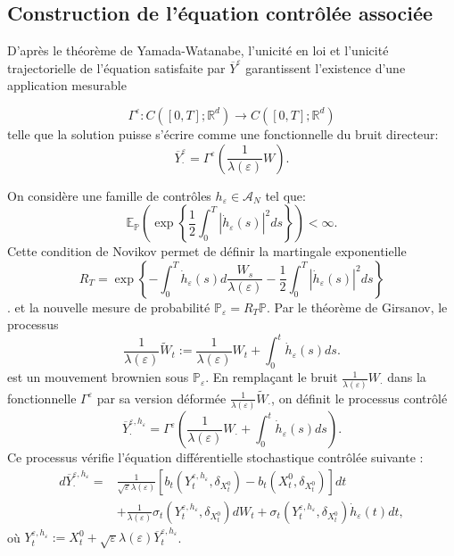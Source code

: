 \documentclass[12pt,a4paper,twoside]{report}%
\theoremstyle{definition}
\numberwithin{equation}{section}
\begin{document}
	 \subsection{Construction de l’équation contrôlée associée} 
	D'après le théorème de Yamada-Watanabe, l'unicité en loi et l'unicité trajectorielle de l'équation satisfaite par $\overline{Y}^\varepsilon$  garantissent l'existence d'une application mesurable
	
\[
\Gamma^\varepsilon:C([0,T];\mathbb{R}^d)\to C([0,T];\mathbb{R}^d)
\]
telle que la solution puisse s'écrire comme une fonctionnelle du bruit directeur:
	 \[
	 \overline{Y}_{\cdot}^\varepsilon = \Gamma^\varepsilon\left(\frac{1}{\lambda(\varepsilon)}W\right).
	 \]
	 
	On considère une famille de contrôles $h_\varepsilon\in \mathscr{A}_N$ tel que:
	 \[
	 \mathbb{E}_{\mathbb{P}} \left( \exp \left\{ \frac{1}{2} \int_0^T |\dot{h}_\varepsilon(s)|^2 ds \right\} \right) < \infty.
	 \]
	Cette condition de Novikov permet de définir la martingale exponentielle 
	 \[R_T = \exp \left\{ - \int_0^T \dot{h}_\varepsilon(s) d \frac{W_s}{\lambda(\varepsilon)} - \frac{1}{2} \int_0^T |\dot{h}_\varepsilon(s)|^2 ds \right\}\].
	 et la nouvelle mesure de probabilité $\mathbb{P}_\varepsilon=R_T\mathbb{P}$.
	 Par le théorème de Girsanov, le processus
	 \[
	 \frac{1}{\lambda(\varepsilon)}\widetilde{W}_t:=\frac{1}{\lambda(\varepsilon)}W_t+\int_{0}^{t}\dot{h}_\varepsilon(s)ds.
	 \] est un mouvement brownien sous $\mathbb{P}_\varepsilon$.
	 En remplaçant le bruit $\frac{1}{\lambda(\varepsilon)}W_\cdot$ dans la fonctionnelle $\Gamma^\varepsilon$ par sa version déformée $ \frac{1}{\lambda(\varepsilon)}\widetilde{W}_\cdot$, on définit le processus contrôlé
	 \[
	  \overline{Y}_\cdot^{\varepsilon,h_\varepsilon} = \Gamma^\varepsilon \left( \frac{1}{\lambda(\varepsilon)} W_\cdot + \int_0^t \dot{h}_\varepsilon(s) ds \right).
	 \]
	 Ce processus vérifie l'équation différentielle stochastique contrôlée suivante :
	 \begin{equation}\label{eq:3.2.7}
	 	\begin{aligned}d \overline{Y}_\cdot^{\varepsilon,h_\varepsilon} =& \frac{1}{\sqrt{\varepsilon }\lambda(\varepsilon)} [b_t (Y_t^{\varepsilon,h_\varepsilon}, \delta_{X_t^0}) - b_t (X_t^0, \delta_{X_t^0})] dt \\&+ \frac{1}{\lambda(\varepsilon)} \sigma_t (Y_t^{\varepsilon,h_\varepsilon}, \delta_{X_t^0}) dW_t + \sigma_t (Y_t^{\varepsilon,h_\varepsilon}, \delta_{X_t^0}) \dot{h}_\varepsilon(t) dt,
	 	\end{aligned}
	 \end{equation}
	 où \(Y_t^{\varepsilon,h_\varepsilon} := X_t^0 + \sqrt{\varepsilon} \lambda(\varepsilon) \overline{Y}_t^{\varepsilon,h_\varepsilon}\).
	 
\end{document}
